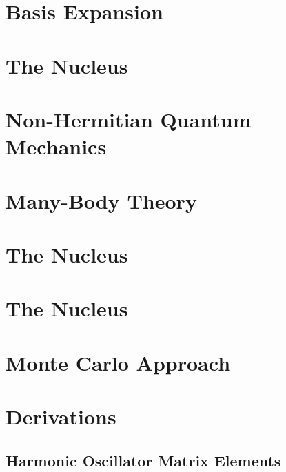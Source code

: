 \documentclass[12pt,a4paper]{report}
\begin{document}
\chapter{Basis Expansion}
\label{cha:basis expansion}


\chapter{The  Nucleus}
\label{cha:he5}


\chapter{Non-Hermitian Quantum Mechanics} 
\label{cha:nhqm}


\chapter{Many-Body Theory}
\label{cha:many-body}



\chapter{The  Nucleus}
\label{cha:he6}


\chapter{The  Nucleus}
\label{cha:he7}

\chapter{Monte Carlo Approach}
\label{cha:monte carlo}

\appendix


\chapter{Derivations}

\section{Harmonic Oscillator Matrix Elements}
\label{sec:HO matrix elements}


\end{document}
